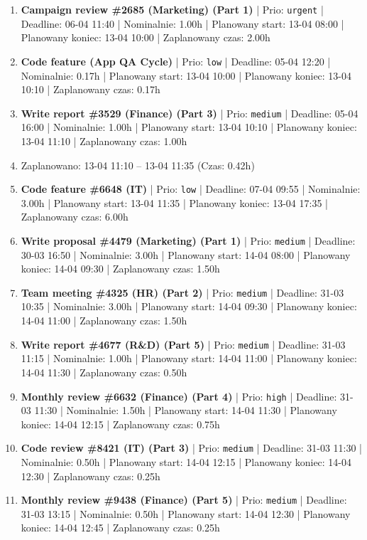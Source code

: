{\begin{enumerate}
  \item [\textbf{14607}] \textbf{Campaign review \#2685 (Marketing) (Part 1)} | Prio: \texttt{urgent} | Deadline: 06-04 11:40 | Nominalnie: 1.00h | Planowany start: 13-04 08:00 | Planowany koniec: 13-04 10:00 | Zaplanowany czas: 2.00h
  \item [\textbf{14703}] \textbf{Code feature (App QA Cycle)} | Prio: \texttt{low} | Deadline: 05-04 12:20 | Nominalnie: 0.17h | Planowany start: 13-04 10:00 | Planowany koniec: 13-04 10:10 | Zaplanowany czas: 0.17h
  \item [\textbf{14672}] \textbf{Write report \#3529 (Finance) (Part 3)} | Prio: \texttt{medium} | Deadline: 05-04 16:00 | Nominalnie: 1.00h | Planowany start: 13-04 10:10 | Planowany koniec: 13-04 11:10 | Zaplanowany czas: 1.00h
  \item [\textbf{PRZERWA}] Zaplanowano: 13-04 11:10 -- 13-04 11:35 (Czas: 0.42h)
  \item [\textbf{14683}] \textbf{Code feature \#6648 (IT)} | Prio: \texttt{low} | Deadline: 07-04 09:55 | Nominalnie: 3.00h | Planowany start: 13-04 11:35 | Planowany koniec: 13-04 17:35 | Zaplanowany czas: 6.00h
  \item [\textbf{14660}] \textbf{Write proposal \#4479 (Marketing) (Part 1)} | Prio: \texttt{medium} | Deadline: 30-03 16:50 | Nominalnie: 3.00h | Planowany start: 14-04 08:00 | Planowany koniec: 14-04 09:30 | Zaplanowany czas: 1.50h
  \item [\textbf{14641}] \textbf{Team meeting \#4325 (HR) (Part 2)} | Prio: \texttt{medium} | Deadline: 31-03 10:35 | Nominalnie: 3.00h | Planowany start: 14-04 09:30 | Planowany koniec: 14-04 11:00 | Zaplanowany czas: 1.50h
  \item [\textbf{14640}] \textbf{Write report \#4677 (R\&D) (Part 5)} | Prio: \texttt{medium} | Deadline: 31-03 11:15 | Nominalnie: 1.00h | Planowany start: 14-04 11:00 | Planowany koniec: 14-04 11:30 | Zaplanowany czas: 0.50h
  \item [\textbf{14615}] \textbf{Monthly review \#6632 (Finance) (Part 4)} | Prio: \texttt{high} | Deadline: 31-03 11:30 | Nominalnie: 1.50h | Planowany start: 14-04 11:30 | Planowany koniec: 14-04 12:15 | Zaplanowany czas: 0.75h
  \item [\textbf{14665}] \textbf{Code review \#8421 (IT) (Part 3)} | Prio: \texttt{medium} | Deadline: 31-03 11:30 | Nominalnie: 0.50h | Planowany start: 14-04 12:15 | Planowany koniec: 14-04 12:30 | Zaplanowany czas: 0.25h
  \item [\textbf{14656}] \textbf{Monthly review \#9438 (Finance) (Part 5)} | Prio: \texttt{medium} | Deadline: 31-03 13:15 | Nominalnie: 0.50h | Planowany start: 14-04 12:30 | Planowany koniec: 14-04 12:45 | Zaplanowany czas: 0.25h

\end{enumerate}}
